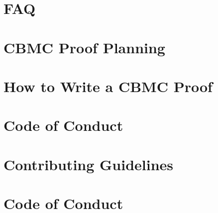 \documentclass[twoside]{book}
\newcommand{\+}{\discretionary{\mbox{\scriptsize$\hookleftarrow$}}{}{}}
\begin{document}
\chapter{FAQ}
\label{md_crt_aws_crt_cpp_crt_aws_c_common_verification_cbmc_templates_training_material__f_a_q}

\chapter{CBMC Proof Planning}
\label{md_crt_aws_crt_cpp_crt_aws_c_common_verification_cbmc_templates_training_material__p_l_a_n_n_i_n_g}

\chapter{How to Write a CBMC Proof}
\label{md_crt_aws_crt_cpp_crt_aws_c_common_verification_cbmc_templates_training_material__p_r_o_o_f__w_r_i_t_i_n_g}

\chapter{Code of Conduct}
\label{md_crt_aws_crt_cpp_crt_aws_c_compression__c_o_d_e__o_f__c_o_n_d_u_c_t}

\chapter{Contributing Guidelines}
\label{md_crt_aws_crt_cpp_crt_aws_c_compression__c_o_n_t_r_i_b_u_t_i_n_g}

\chapter{Code of Conduct}
\label{md_crt_aws_crt_cpp_crt_aws_c_event_stream__c_o_d_e__o_f__c_o_n_d_u_c_t}

\end{document}
